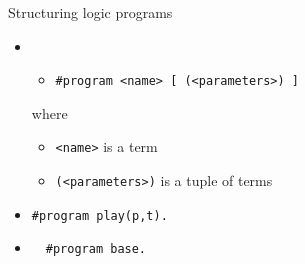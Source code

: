 \begin{frame}{Structuring logic programs}
  \begin{itemize}
  \item {}
    \medskip
    \begin{itemize}
    \item [] \texttt{\#program <name> [ (<parameters>) ]}
    \end{itemize}
    \medskip
    where
    \smallskip
    \begin{itemize}
    \item \texttt{<name>} is a term
    \item \texttt{(<parameters>)} is a tuple of terms
    \end{itemize}
    \bigskip
  \item<2->  \texttt{\#program play(p,t).}
    \smallskip
  \item<3-> \,  \ \texttt{\#program base.}
  \end{itemize}
\end{frame}
%
